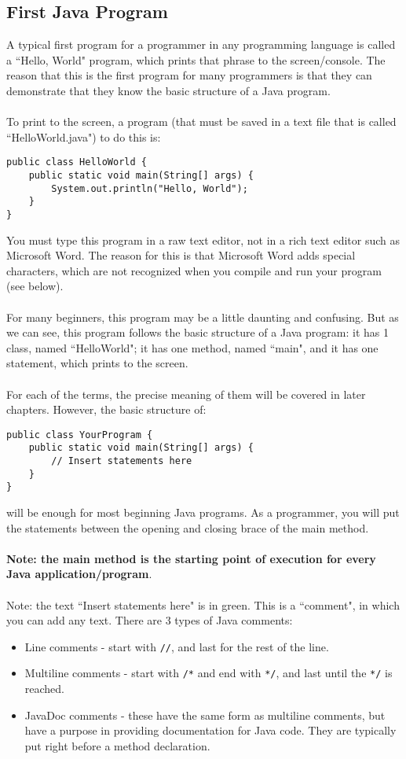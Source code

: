 \subsection{First Java Program}
A typical first program for a programmer in any programming language is called a ``Hello, World" program, which prints that phrase to the screen/console. The reason that this is the first program for many programmers is that they can demonstrate that they know the basic structure of a Java program. 
\\ \\
To print to the screen, a program (that must be saved in a text file that is called ``HelloWorld.java") to do this is:
\begin{lstlisting}
public class HelloWorld {
	public static void main(String[] args) {
		System.out.println("Hello, World");
	}
}
\end{lstlisting}
You must type this program in a raw text editor, not in a rich text editor such as Microsoft Word. The reason for this is that Microsoft Word adds special characters, which are not recognized when you compile and run your program (see below).
\\ \\
For many beginners, this program may be a little daunting and confusing. But as we can see, this program follows the basic structure of a Java program: it has 1 class, named ``HelloWorld"; it has one method, named ``main", and it has one statement, which prints to the screen. 
\\ \\
For each of the terms, the precise meaning of them will be covered in later chapters. However, the basic structure of:
\begin{lstlisting}
public class YourProgram {
	public static void main(String[] args) {
		// Insert statements here
	}
}
\end{lstlisting}
will be enough for most beginning Java programs. As a programmer, you will put the statements between the opening and closing brace of the main method.
\\ \\
\textbf{Note: the main method is the starting point of execution for every Java application/program}.
\\ \\
Note: the text ``Insert statements here" is in green. This is a ``comment", in which you can add any text. There are 3 types of Java comments:

\begin{itemize}
\item Line comments - start with \verb|//|, and last for the rest of the line.
\item Multiline comments - start with \verb|/*| and end with \verb|*/|, and last until the \verb|*/| is reached.
\item JavaDoc comments - these have the same form as multiline comments, but have a purpose in providing documentation for Java code. They are typically put right before a method declaration.
\end{itemize}

